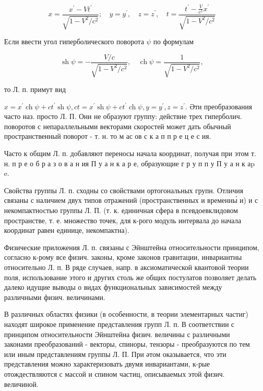 \documentclass[10pt]{article}
\begin{document}
\[

x=\frac{x^{\prime}-V t^{\prime}}{\sqrt{1-V^{2} / c^{2}}} ; \quad y=y^{\prime}, \quad z=z^{\prime}, \quad t=\frac{t^{\prime}-\frac{V}{c^{2}} x^{\prime}}{\sqrt{1-V^{2} / c^{2}}}

\]



Если ввести угол гиперболического поворота $\psi$ по формулам



\[

\operatorname{sh} \psi=-\frac{V / c}{\sqrt{1-V^{2} / c^{2}}}, \quad \operatorname{ch} \psi=\frac{1}{\sqrt{1-V^{2} / c^{2}}},

\]



то Л. п. примут вид



$x=x^{\prime} \operatorname{ch} \psi+c t^{\prime} \operatorname{sh} \psi, c t=x^{\prime} \operatorname{sh} \psi+c t^{\prime} \operatorname{ch} \psi, y=y^{\prime}, z=z^{\prime}$. Әти преобразования часто наз. просто Л. П. Они не образуют группу: действие трех гиперболич. поворотов с непараллельными векторами скоростей может дать обычный пространственный поворот - т. н. то м ас ов с к а п п р е ц е с ия.



Часто к общим Л. п. добавляют переносы начала координат, получая при этом т. н. п р е о б р а з о в а н ия П у а н к а р е, образующие г р у п п у П у а н к аp e.



Свойства группы Л. п. сходны со свойствами ортогональных групн. Отличия связаны с наличием двух типов отражений (пространственных и временны́ и) и с некомпактностью группы Л. П. (т. к. единичная сфера в псевдоевклидовом пространстве, т. е. множество точек, для к-рого модуль интервала до начала координат равен единице, некомпактна).



Физические приложения Л. п. связаны с Эйнштейна относительности принципом, согласно к-рому все физич. законы, кроме законов гравитации, инвариантны относительно Л. п. В ряде случаев, напр. в аксиоматической квантовой теории поля, использование этого и других столь же общих постулатов позволяет делать далеко идущие выводы о видах функциональных зависимостей между различными физич. величинами.



В различных областях физики (в особенности, в теории элементарных частиг) находят широкое применение представления групп Л. п. В соответствии с принципом относительности Эйнштейна физич. величины с различными законами преобразований - векторы, спиноры, тензоры - преобразуются по тем или иным представлениям группы Л. П. При әтом оказывается, что эти представления можно характеризовать двумя инвариантами, к-рые отождествляются с массой и спином частиц, описываемых этой физич. величиной.
\end{document}
